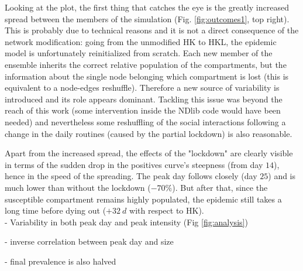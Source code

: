 \documentclass[DIV=12, BCOR=0pt]{scrartcl}  %
\begin{document}
	Looking at the plot, the first thing that catches the eye is the  greatly increased spread between the members of the simulation (Fig. \ref{fig:outcomes1}, top right). This is probably due to technical reasons and it is not a direct consequence of the network modification: going from the unmodified HK to HKL, the epidemic model is unfortunately reinitialized from scratch. Each new member of the ensemble inherits the correct relative population of the compartments, but the information about the single node belonging which compartment is lost (this is equivalent to a node-edges reshuffle). Therefore a new source of variability is introduced and its role appears dominant. Tackling this issue was beyond the reach of this work (some intervention inside the NDlib code would have been needed) and nevertheless some reshuffling of the social interactions following a change in the daily routines (caused by the partial lockdown) is also reasonable.
	
	Apart from the increased spread, the effects of the "lockdown" are clearly visible in terms of the sudden drop in the positives curve's steepness (from day $14$), hence in the speed of the spreading. The peak day follows closely (day $25$) and is much lower than without the lockdown ($- 70 \%$). But after that, since the susceptible compartment remains highly populated, the epidemic still takes a long time before dying out ($+ 32 \ d$ with respect to HK).\\
	
	- Variability in both peak day and peak intensity (Fig \ref{fig:analysis})
	
  - inverse correlation between peak day and size	 
  
 	- final prevalence is also halved
 	
\end{document}
